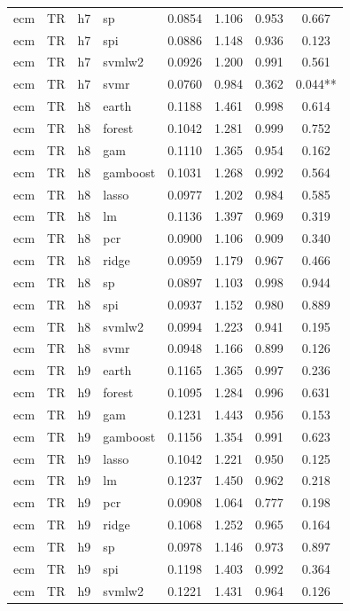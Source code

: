 \begin{ThreePartTable}
\begin{longtable}[t]{llclcccc}
ecm & TR & h7 & sp & 0.0854 & 1.106 & 0.953 & 0.667\\
ecm & TR & h7 & spi & 0.0886 & 1.148 & 0.936 & 0.123\\
ecm & TR & h7 & svmlw2 & 0.0926 & 1.200 & 0.991 & 0.561\\
ecm & TR & h7 & svmr & 0.0760 & 0.984 & 0.362 & 0.044**\\
\addlinespace
ecm & TR & h8 & earth & 0.1188 & 1.461 & 0.998 & 0.614\\
ecm & TR & h8 & forest & 0.1042 & 1.281 & 0.999 & 0.752\\
ecm & TR & h8 & gam & 0.1110 & 1.365 & 0.954 & 0.162\\
ecm & TR & h8 & gamboost & 0.1031 & 1.268 & 0.992 & 0.564\\
ecm & TR & h8 & lasso & 0.0977 & 1.202 & 0.984 & 0.585\\
ecm & TR & h8 & lm & 0.1136 & 1.397 & 0.969 & 0.319\\
ecm & TR & h8 & pcr & 0.0900 & 1.106 & 0.909 & 0.340\\
ecm & TR & h8 & ridge & 0.0959 & 1.179 & 0.967 & 0.466\\
ecm & TR & h8 & sp & 0.0897 & 1.103 & 0.998 & 0.944\\
ecm & TR & h8 & spi & 0.0937 & 1.152 & 0.980 & 0.889\\
ecm & TR & h8 & svmlw2 & 0.0994 & 1.223 & 0.941 & 0.195\\
ecm & TR & h8 & svmr & 0.0948 & 1.166 & 0.899 & 0.126\\
\addlinespace
ecm & TR & h9 & earth & 0.1165 & 1.365 & 0.997 & 0.236\\
ecm & TR & h9 & forest & 0.1095 & 1.284 & 0.996 & 0.631\\
ecm & TR & h9 & gam & 0.1231 & 1.443 & 0.956 & 0.153\\
ecm & TR & h9 & gamboost & 0.1156 & 1.354 & 0.991 & 0.623\\
ecm & TR & h9 & lasso & 0.1042 & 1.221 & 0.950 & 0.125\\
ecm & TR & h9 & lm & 0.1237 & 1.450 & 0.962 & 0.218\\
ecm & TR & h9 & pcr & 0.0908 & 1.064 & 0.777 & 0.198\\
ecm & TR & h9 & ridge & 0.1068 & 1.252 & 0.965 & 0.164\\
ecm & TR & h9 & sp & 0.0978 & 1.146 & 0.973 & 0.897\\
ecm & TR & h9 & spi & 0.1198 & 1.403 & 0.992 & 0.364\\
ecm & TR & h9 & svmlw2 & 0.1221 & 1.431 & 0.964 & 0.126\\

\end{longtable}
\end{ThreePartTable}
